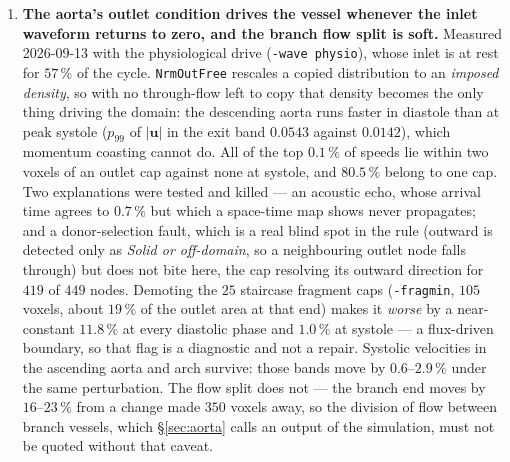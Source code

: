 \documentclass[11pt,a4paper]{article}
\newcommand{\code}[1]{\texttt{\small #1}}
\newcommand{\e}[1]{\times 10^{#1}}
\begin{document}
\begin{enumerate}[leftmargin=1.4em,itemsep=4pt]
  Two further cautions from that sweep. The volume estimator
  $\mathrm{Nu}_{\rm vol}$ carries a factor $H/D$ --- $1.7\e{8}$ at
  $\mathrm{Ra}=10^{14}$ --- so an accidental velocity--temperature correlation is
  amplified enormously; in a state that is provably not convecting it read
  $180$, $606$, $1216$, $1719$ while both plate estimators sat correctly at
  $1.0$, and at $\mathrm{Ra}=10^{10}$ it alternated sign. Its uncorrelated-noise
  floor $H u'_{\rm rms}T'_{\rm rms}/(D\,\Delta T\sqrt{N})$ is exceeded by a
  factor $28$--$36$, consistently across a hundredfold change in $D$, because
  the spurious velocity is correlated over some $900$ cells; the floor is a
  lower bound and the reliable signal is agreement between the two plate
  estimators. And the volume relation must be written on the FLUCTUATIONS,
  $\langle v T\rangle-\langle v\rangle\langle T\rangle$: Guo's half shift puts
  a uniform $F/(2\rho)$ into the reported velocity, so with a mean temperature
  away from $T_0$ the textbook $\langle vT\rangle$ form returned
  $\mathrm{Nu}=53.77$ for a fluid at rest, where the answer is exactly $1$.

\item \textbf{The aorta's outlet condition drives the vessel whenever the inlet
  waveform returns to zero, and the branch flow split is soft.} Measured
  2026-09-13 with the physiological drive (\code{-wave physio}), whose inlet is
  at rest for $57\,\%$ of the cycle. \code{NrmOutFree} rescales a copied
  distribution to an \emph{imposed density}, so with no through-flow left to
  copy that density becomes the only thing driving the domain: the descending
  aorta runs faster in diastole than at peak systole ($p_{99}$ of $|\bm{u}|$ in
  the exit band $0.0543$ against $0.0142$), which momentum coasting cannot do.
  All of the top $0.1\,\%$ of speeds lie within two voxels of an outlet cap
  against none at systole, and $80.5\,\%$ belong to one cap. Two explanations
  were tested and killed --- an acoustic echo, whose arrival time agrees to
  $0.7\,\%$ but which a space-time map shows never propagates; and a
  donor-selection fault, which is a real blind spot in the rule (outward is
  detected only as \emph{Solid or off-domain}, so a neighbouring outlet node
  falls through) but does not bite here, the cap resolving its outward direction
  for $419$ of $449$ nodes. Demoting the $25$ staircase fragment caps
  (\code{-fragmin}, $105$ voxels, about $19\,\%$ of the outlet area at that end)
  makes it \emph{worse} by a near-constant $11.8\,\%$ at every diastolic phase
  and $1.0\,\%$ at systole --- a flux-driven boundary, so that flag is a
  diagnostic and not a repair. Systolic velocities in the ascending aorta and
  arch survive: those bands move by $0.6$--$2.9\,\%$ under the same
  perturbation. The flow split does not --- the branch end moves by
  $16$--$23\,\%$ from a change made $350$ voxels away, so the division of flow
  between branch vessels, which \S\ref{sec:aorta} calls an output of the
  simulation, must not be quoted without that caveat.



\end{enumerate}
\end{document}
